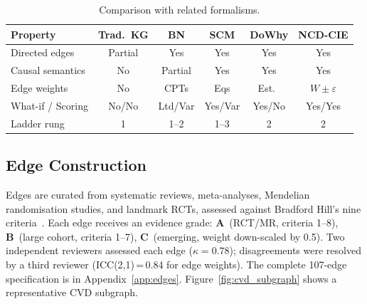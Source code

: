 \documentclass[runningheads]{llncs}
\begin{document}
\renewcommand{\arraystretch}{1.1}
\begin{table}[t]
\centering
\caption{Comparison with related formalisms.}
\label{tab:comparison}
\small
\begin{tabular}{@{}lccccc@{}}
\toprule
\textbf{Property} & \textbf{Trad.\ KG} & \textbf{BN} & \textbf{SCM} & \textbf{DoWhy} & \textbf{NCD-CIE} \\
\midrule
Directed edges       & Partial & Yes & Yes & Yes & Yes \\
Causal semantics     & No      & Partial & Yes & Yes & Yes \\
Edge weights         & No      & CPTs & Eqs & Est.\ & $W \pm \varepsilon$ \\
What-if / Scoring    & No/No   & Ltd/Var & Yes/Var & Yes/No & Yes/Yes \\
Ladder rung          & 1       & 1--2 & 1--3 & 2  & 2 \\
\bottomrule
\end{tabular}
\end{table}
\renewcommand{\arraystretch}{1.0}

\subsection{Edge Construction}\label{sec:edges}

Edges are curated from systematic reviews, meta-analyses, Mendelian
randomisation studies, and landmark RCTs, assessed against
Bradford Hill's nine criteria~\cite{hill1965environment}.
Each edge receives an evidence grade:
\textbf{A}~(RCT/MR, criteria 1--8),
\textbf{B}~(large cohort, criteria 1--7),
\textbf{C}~(emerging, weight down-scaled by 0.5).
Two independent reviewers assessed each edge ($\kappa = 0.78$);
disagreements were resolved by a third reviewer
(ICC(2,1)\,=\,0.84 for edge weights).
The complete 107-edge specification is in
Appendix~\ref{app:edges}.
Figure~\ref{fig:cvd_subgraph} shows a representative CVD subgraph.
\end{document}
